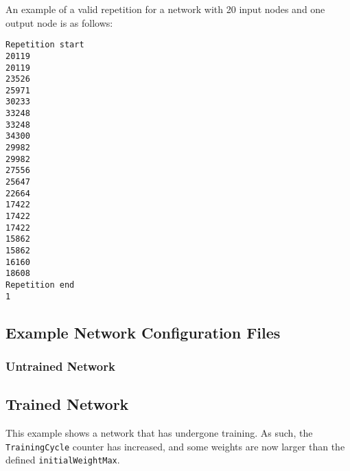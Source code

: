 \documentclass[a4paper]{article}
\begin{document}
An example of a valid repetition for a network with 20 input nodes and one output node is as follows:

\begin{lstlisting}
Repetition start
20119
20119
23526
25971
30233
33248
33248
34300
29982
29982
27556
25647
22664
17422
17422
17422
15862
15862
16160
18608
Repetition end
1
\end{lstlisting}

\subsection{Example Network Configuration Files}%

\subsubsection{Untrained Network}


\subsection{Trained Network}

This example shows a network that has undergone training. As such, the \lstinline{TrainingCycle} counter has increased, and some weights are now larger than the defined \lstinline{initialWeightMax}.
\end{document}
